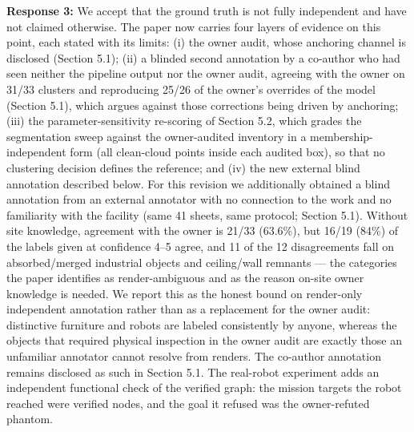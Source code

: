 \documentclass[11pt]{article}
\begin{document}
\textbf{Response 3:} We accept that the ground truth is not fully independent and have not claimed otherwise. The paper now carries four layers of evidence on this point, each stated with its limits: (i) the owner audit, whose anchoring channel is disclosed (Section 5.1); (ii) a blinded second annotation by a co-author who had seen neither the pipeline output nor the owner audit, agreeing with the owner on 31/33 clusters and reproducing 25/26 of the owner's overrides of the model (Section 5.1), which argues against those corrections being driven by anchoring; (iii) the parameter-sensitivity re-scoring of Section 5.2, which grades the segmentation sweep against the owner-audited inventory in a membership-independent form (all clean-cloud points inside each audited box), so that no clustering decision defines the reference; and (iv) the new external blind annotation described below. For this revision we additionally obtained a blind annotation from an external annotator with no connection to the work and no familiarity with the facility (same 41 sheets, same protocol; Section 5.1). Without site knowledge, agreement with the owner is 21/33 (63.6\%), but 16/19 (84\%) of the labels given at confidence 4--5 agree, and 11 of the 12 disagreements fall on absorbed/merged industrial objects and ceiling/wall remnants --- the categories the paper identifies as render-ambiguous and as the reason on-site owner knowledge is needed. We report this as the honest bound on render-only independent annotation rather than as a replacement for the owner audit: distinctive furniture and robots are labeled consistently by anyone, whereas the objects that required physical inspection in the owner audit are exactly those an unfamiliar annotator cannot resolve from renders. The co-author annotation remains disclosed as such in Section 5.1. The real-robot experiment adds an independent functional check of the verified graph: the mission targets the robot reached were verified nodes, and the goal it refused was the owner-refuted phantom.
\end{document}
